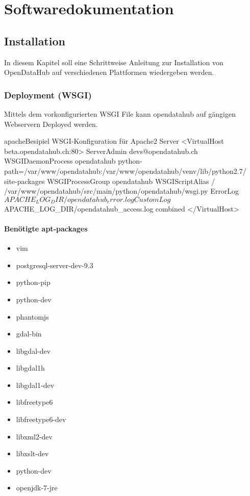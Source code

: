 \part{Softwaredokumentation}

\chapter{Installation}
In diesem Kapitel soll eine Schrittweise Anleitung zur Installation von OpenDataHub auf verschiedenen Plattformen wiedergeben werden.
\section{Deployment (WSGI)}
Mittels dem vorkonfigurierten WSGI File kann opendatahub auf gängigen Webservern Deployed werden.
\begin{srclst}[label=lst:wsgi-configuration]{apache}{Besipiel WSGI-Konfiguration für Apache2 Server}
<VirtualHost beta.opendatahub.ch:80>
	ServerAdmin devs@opendatahub.ch
	WSGIDaemonProcess opendatahub python-path=/var/www/opendatahub:/var/www/opendatahub/venv/lib/python2.7/ site-packages
	WSGIProcessGroup opendatahub
	WSGIScriptAlias / /var/www/opendatahub/src/main/python/opendatahub/wsgi.py
	ErrorLog ${APACHE_LOG_DIR}/opendatahub_error.log
	CustomLog ${APACHE_LOG_DIR}/opendatahub_access.log combined
</VirtualHost>
\end{srclst}
\subsection{Benötigte apt-packages}
\begin{itemize}
\item{vim}
\item{postgresql-server-dev-9.3}
\item{python-pip}
\item{python-dev}
\item{phantomjs}
\item{gdal-bin}
\item{libgdal-dev}
\item{libgdal1h}
\item{libgdal1-dev}
\item{libfreetype6}
\item{libfreetype6-dev}
\item{libxml2-dev}
\item{libxslt-dev}
\item{python-dev}
\item{openjdk-7-jre}

\end{itemize}
